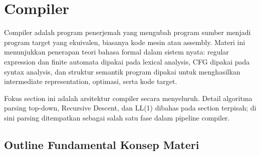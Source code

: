 \section{Compiler}

Compiler adalah program penerjemah yang mengubah program sumber menjadi program target yang ekuivalen, biasanya kode mesin atau assembly. Materi ini menunjukkan penerapan teori bahasa formal dalam sistem nyata: regular expression dan finite automata dipakai pada lexical analysis, CFG dipakai pada syntax analysis, dan struktur semantik program dipakai untuk menghasilkan intermediate representation, optimasi, serta kode target.

Fokus section ini adalah arsitektur compiler secara menyeluruh. Detail algoritma parsing top-down, Recursive Descent, dan LL(1) dibahas pada section terpisah; di sini parsing ditempatkan sebagai salah satu fase dalam pipeline compiler.

\subsection{Outline Fundamental Konsep Materi}

